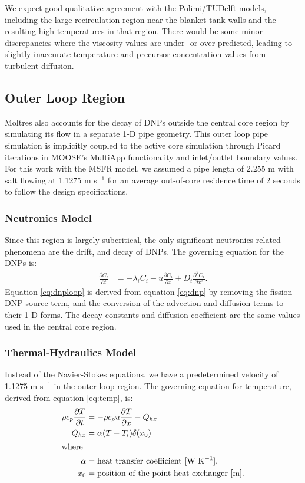 We expect good qualitative agreement with the Polimi/TUDelft models,
including the large recirculation region near the blanket tank walls and the
resulting high temperatures in that region. There would be some minor
discrepancies where the viscosity values are under- or over-predicted, leading
to slightly inaccurate temperature and precursor concentration values from
turbulent diffusion.

\subsection{Outer Loop Region}

Moltres also accounts for the decay of
\glspl{DNP} outside the central core region by simulating its flow in a
separate 1-D pipe geometry. This outer loop pipe simulation is implicitly
coupled to the active core simulation through Picard iterations in MOOSE's
MultiApp functionality and inlet/outlet boundary values. For this work with
the \gls{MSFR} model, we assumed a pipe
length of 2.255 m with salt flowing at 1.1275 m s$^{-1}$ for an average
out-of-core residence time of 2 seconds to follow the design specifications.

\subsubsection{Neutronics Model}

Since this region is largely subcritical, the only significant
neutronics-related phenomena are the drift, and decay of \glspl{DNP}.
The governing equation for the \glspl{DNP} is:
%
\begin{align}
    \frac{\partial C_i}{\partial t} &= - \lambda_i C_i - u
    \frac{\partial C_i}{\partial x} + D_t \frac{\partial^2 C_i}{\partial x^2}.
    \label{eq:dnploop}
\end{align}
%
Equation \ref{eq:dnploop} is derived from equation \ref{eq:dnp} by removing
the fission \gls{DNP} source term, and the conversion of the advection and
diffusion terms to their 1-D forms. The decay constants and diffusion
coefficient are the same values used in the central core region.

\subsubsection{Thermal-Hydraulics Model}

Instead of the Navier-Stokes equations, we have a predetermined velocity of
1.1275 m s$^{-1}$ in the outer loop region. The governing equation for
temperature, derived from equation \ref{eq:temp}, is:
%
\begin{align}
    \rho c_{p} \frac{\partial T}{\partial t} &= - \rho c_p u
    \frac{\partial T}{\partial x} - Q_{hx} \label{eq:temploop} \\
    Q_{hx} &= \alpha (T - T_i) \delta (x_0) \label{eq:hx} \\
    \intertext{where}
    \alpha &= \text{heat transfer coefficient [W K$^{-1}$],} \nonumber \\
    x_0 &= \text{position of the point heat exchanger [m].} \nonumber
\end{align}

